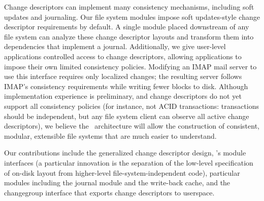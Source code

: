 Change descriptors can implement many consistency mechanisms, including
 soft updates and journaling.
%
Our file system modules impose soft updates-style change descriptor
 requirements by default.
%
A single module placed downstream of any file system can analyze these
 change descriptor layouts and transform them into dependencies that
 implement a journal.
%
Additionally, we give user-level applications controlled access to change
 descriptors, allowing applications to impose their own limited consistency
 policies.
%
Modifying an IMAP mail server to use this interface requires only localized
 changes; the resulting server follows IMAP's consistency
 requirements while writing fewer blocks to disk.
%
Although implementation experience is preliminary, and change descriptors
 do not yet support all consistency policies (for instance, not ACID
 transactions: transactions should be independent, but any file system
 client can observe all active change descriptors), we believe the \Kudos\
 architecture will allow the construction of consistent, modular,
 extensible file systems that are much easier to understand.



Our contributions include the generalized change descriptor design,
 \Kudos's module interfaces (a particular innovation is the separation of
 the low-level specification of on-disk layout from higher-level
 file-system-independent code), particular modules including the journal
 module and the write-back cache, and the changegroup interface that
 exports change descriptors to userspace.


\begin{comment}
 The rest of this 
 A particular innovation of the
 \module\ design is the separation of the low-level specification of on-disk
 layout from higher-level file system-independent code, which operates on
 abstract disk structures.
 Our journaling \module\ can automatically add
 journaling to any file system, and combinations of simple \modules\ can support,
 for example, correct consistency on RAID over loop-back devices.
\end{comment}




